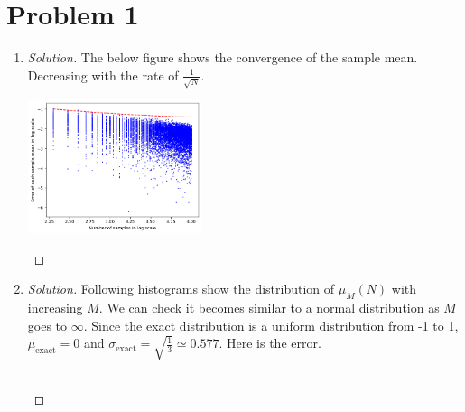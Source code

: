 \section*{Problem 1}
	\begin{enumerate} [1)]
		\item \begin{proof} [Solution]
			The below figure shows the convergence of the sample mean. Decreasing with the rate of $\frac{1}{\sqrt{N}}$.
			\begin{center}
				\includegraphics[width=0.4\textwidth]{example.png}
			\end{center}
		\end{proof}
		\item \begin{proof} [Solution]
			Following histograms show the distribution of $\mu_M(N)$ with increasing $M$. We can check it becomes similar to a normal distribution as $M$ goes to $\infty$. Since the exact distribution is a uniform distribution from -1 to 1, $\mu_{\mbox{exact}} = 0$ and $\sigma_{\mbox{exact}} = \sqrt{\frac{1}{3}} \simeq 0.577$. Here is the error.
			\begin{figure} [htb!]
				\centering
			\end{figure}\\

\end{proof}
\end{enumerate}
